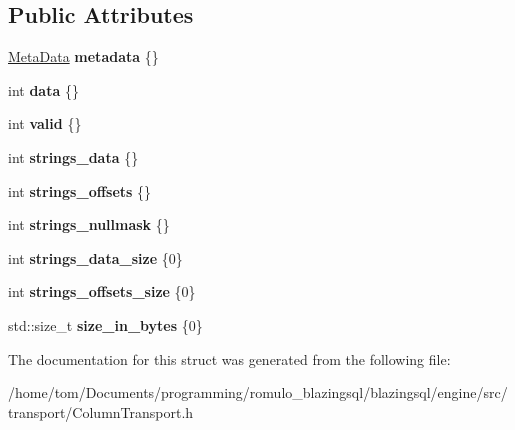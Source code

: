 \subsection*{Public Attributes}
\begin{DoxyCompactItemize}
\item 
\mbox{\label{structblazingdb_1_1transport_1_1ColumnTransport_acf9500e94299bb1e6658731e6840fe16}} 
\hyperlink{structblazingdb_1_1transport_1_1ColumnTransport_1_1MetaData}{Meta\+Data} {\bfseries metadata} \{\}
\item 
\mbox{\label{structblazingdb_1_1transport_1_1ColumnTransport_a425f4e29b911f369487f7229d6f51847}} 
int {\bfseries data} \{\}
\item 
\mbox{\label{structblazingdb_1_1transport_1_1ColumnTransport_ae8252232b90d35c7ef1281d37e297e82}} 
int {\bfseries valid} \{\}
\item 
\mbox{\label{structblazingdb_1_1transport_1_1ColumnTransport_aab04290a0ff26b843aa944e85d4072fe}} 
int {\bfseries strings\+\_\+data} \{\}
\item 
\mbox{\label{structblazingdb_1_1transport_1_1ColumnTransport_a82c325aab3b26ca3be341a1560137a47}} 
int {\bfseries strings\+\_\+offsets} \{\}
\item 
\mbox{\label{structblazingdb_1_1transport_1_1ColumnTransport_a1756c2a5479abc9b6ba4d4f3163e1756}} 
int {\bfseries strings\+\_\+nullmask} \{\}
\item 
\mbox{\label{structblazingdb_1_1transport_1_1ColumnTransport_a83f81a9f176c37204cc357937b10ce95}} 
int {\bfseries strings\+\_\+data\+\_\+size} \{0\}
\item 
\mbox{\label{structblazingdb_1_1transport_1_1ColumnTransport_ae70474c73ba8318eb51cb2031702847d}} 
int {\bfseries strings\+\_\+offsets\+\_\+size} \{0\}
\item 
\mbox{\label{structblazingdb_1_1transport_1_1ColumnTransport_a35528b121caf111beb1a984941d358af}} 
std\+::size\+\_\+t {\bfseries size\+\_\+in\+\_\+bytes} \{0\}
\end{DoxyCompactItemize}


The documentation for this struct was generated from the following file\+:\begin{DoxyCompactItemize}
\item 
/home/tom/\+Documents/programming/romulo\+\_\+blazingsql/blazingsql/engine/src/transport/Column\+Transport.\+h\end{DoxyCompactItemize}
